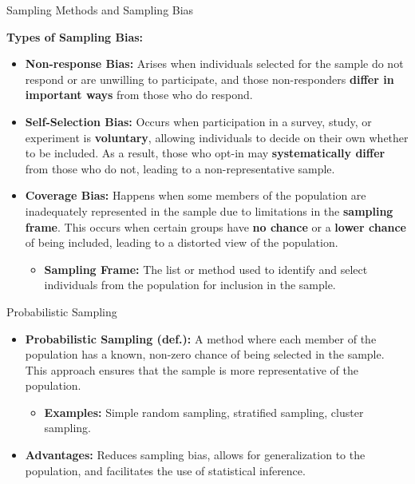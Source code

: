 \documentclass[handout]{beamer} %
\begin{document}
\begin{frame}{Sampling Methods and Sampling Bias}

    \textbf{Types of Sampling Bias:}  
    \begin{itemize}
        \item \textbf{Non-response Bias:}
        Arises when individuals selected for the sample do not respond or are unwilling to participate, and those non-responders \textbf{differ in important ways} from those who do respond. \pause %

        \item \textbf{Self-Selection Bias:}
        Occurs when participation in a survey, study, or experiment is \textbf{voluntary}, allowing individuals to decide on their own whether to be included. As a result, those who opt-in may \textbf{systematically differ} from those who do not, leading to a non-representative sample. \pause 

        \item \textbf{Coverage Bias:}
        Happens when some members of the population are inadequately represented in the sample due to limitations in the \textbf{sampling frame}. This occurs when certain groups have \textbf{no chance} or a \textbf{lower chance} of being included, leading to a distorted view of the population.
        \begin{itemize}
            \item \textbf{Sampling Frame:} The list or method used to identify and select individuals from the population for inclusion in the sample. 
        \end{itemize}
    \end{itemize}

\end{frame}





\begin{frame}{Probabilistic Sampling}
    \begin{itemize}
        \item \textbf{Probabilistic Sampling (def.):} A method where each member of the population has a known, non-zero chance of being selected in the sample. This approach ensures that the sample is more representative of the population. 
        \begin{itemize}
            \item \textbf{Examples:} Simple random sampling, stratified sampling, cluster sampling.
        \end{itemize}

        \item \textbf{Advantages:} Reduces sampling bias, allows for generalization to the population, and facilitates the use of statistical inference.
    \end{itemize}

\end{frame}
\end{document}
